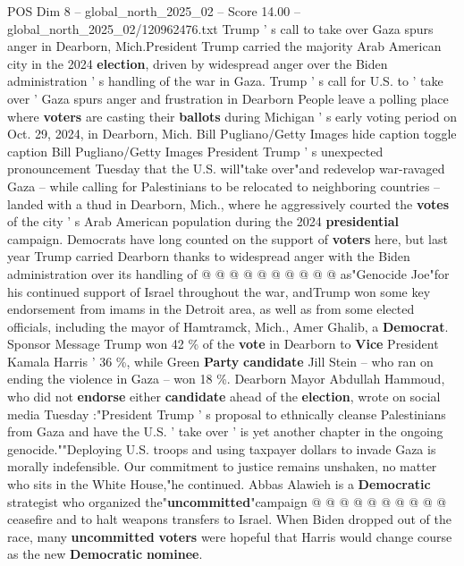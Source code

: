 \begin{textsample}{POS Dim 8 – global\_north\_2025\_02 – Score 14.00 – global\_north\_2025\_02/120962476.txt}  \label{ex:f8_pos_310}
Trump ' s call to take over Gaza spurs anger in Dearborn, Mich.President Trump carried the majority Arab American city in the 2024 \textbf{election}, driven by widespread anger over the Biden administration ' s handling of the war in Gaza.
Trump ' s call for U.S. to ' take over ' Gaza spurs anger and frustration in Dearborn People leave a polling place where \textbf{voters} are casting their \textbf{ballots} during Michigan ' s early voting period on Oct. 29, 2024, in Dearborn, Mich.
Bill Pugliano/Getty Images hide caption toggle caption Bill Pugliano/Getty Images President Trump ' s unexpected pronouncement Tuesday that the U.S. will"take over"and redevelop war-ravaged Gaza -- while calling for Palestinians to be relocated to neighboring countries -- landed with a thud in Dearborn, Mich., where he aggressively courted the \textbf{votes} of the city ' s Arab American population during the 2024 \textbf{presidential} campaign.
Democrats have long counted on the support of \textbf{voters} here, but last year Trump carried Dearborn thanks to widespread anger with the Biden administration over its handling of @ @ @ @ @ @ @ @ @ @ as"Genocide Joe"for his continued support of Israel throughout the war, andTrump won some key endorsement from imams in the Detroit area, as well as from some elected officials, including the mayor of Hamtramck, Mich., Amer Ghalib, a \textbf{Democrat}.
Sponsor Message Trump won 42 \% of the \textbf{vote} in Dearborn to \textbf{Vice} President Kamala Harris ' 36 \%, while Green \textbf{Party} \textbf{candidate} Jill Stein -- who ran on ending the violence in Gaza -- won 18 \%.
Dearborn Mayor Abdullah Hammoud, who did not \textbf{endorse} either \textbf{candidate} ahead of the \textbf{election}, wrote on social media Tuesday :"President Trump ' s proposal to ethnically cleanse Palestinians from Gaza and have the U.S. ' take over ' is yet another chapter in the ongoing genocide.""Deploying U.S. troops and using taxpayer dollars to invade Gaza is morally indefensible.
Our commitment to justice remains unshaken, no matter who sits in the White House,"he continued.
Abbas Alawieh is a \textbf{Democratic} strategist who organized the"\textbf{uncommitted}"campaign @ @ @ @ @ @ @ @ @ @ ceasefire and to halt weapons transfers to Israel.
When Biden dropped out of the race, many \textbf{uncommitted} \textbf{voters} were hopeful that Harris would change course as the new \textbf{Democratic} \textbf{nominee}.

\end{textsample}

